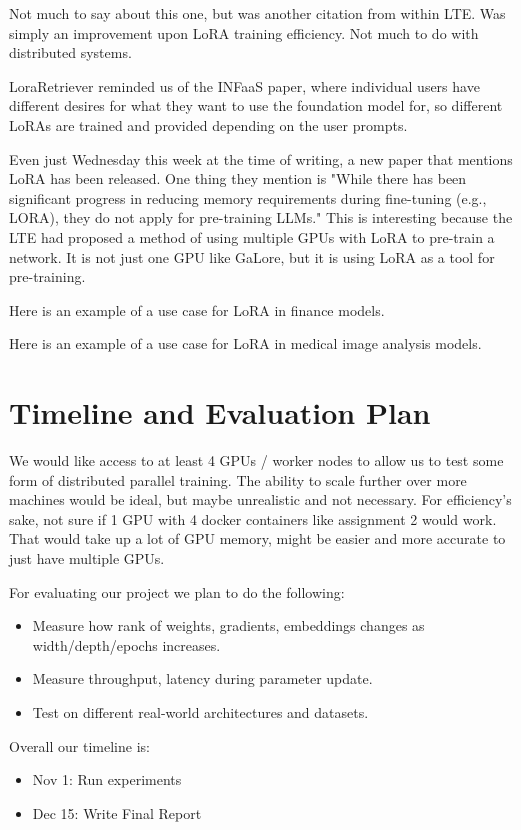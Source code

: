 \documentclass[pdftex,twocolumn,10pt,letterpaper]{article}
\begin{document}
\cite{lialin2023relora}
Not much to say about this one, but was another citation from within LTE. Was simply an improvement upon LoRA training efficiency. Not much to do with distributed systems.

\cite{zhao2024loraretriever}
LoraRetriever reminded us of the INFaaS paper, where individual users have different desires for what they want to use the foundation model for, so different LoRAs are trained and provided depending on the user prompts. 

\cite{zhao2024galore}
Even just Wednesday this week at the time of writing, a new paper that mentions LoRA has been released. One thing they mention is "While there has been significant progress in reducing memory requirements during fine-tuning (e.g., LORA), they do not apply for pre-training LLMs." This is interesting because the LTE had proposed a method of using multiple GPUs with LoRA to pre-train a network. It is not just one GPU like GaLore, but it is using LoRA as a tool for pre-training.

\cite{liu2024fingpt}
Here is an example of a use case for LoRA in finance models.

\cite{zhu2023melo}
Here is an example of a use case for LoRA in medical image analysis models.

\section{Timeline and Evaluation Plan}

We would like access to at least 4 GPUs / worker nodes to allow us to test some form of distributed parallel training. The ability to scale further over more machines would be ideal, but maybe unrealistic and not necessary. For efficiency's sake, not sure if 1 GPU with 4 docker containers like assignment 2 would work. That would take up a lot of GPU memory, might be easier and more accurate to just have multiple GPUs.

For evaluating our project we plan to do the following:
\begin{itemize}
  \item Measure how rank of weights, gradients, embeddings changes as width/depth/epochs increases.
  \item Measure throughput, latency during parameter update.
  \item Test on different real-world architectures and datasets.
\end{itemize}

Overall our timeline is:

\begin{itemize}
  \item Nov 1: Run experiments 
  \item Dec 15: Write Final Report
\end{itemize}

{


}
\end{document}
